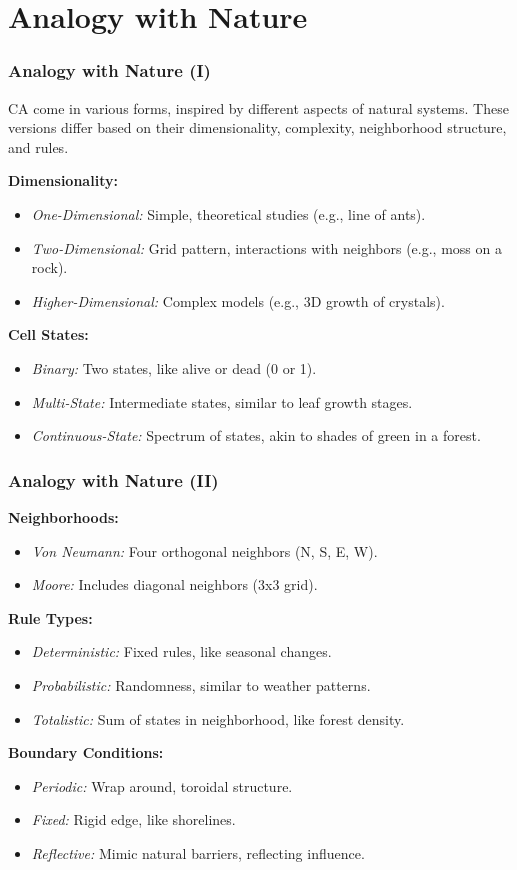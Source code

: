 \documentclass{beamer}
\begin{document}
\section{Analogy with Nature}
\begin{frame}
    \frametitle{Analogy with Nature (I)}
    CA come in various forms, inspired by different aspects of natural systems. These versions differ based on their dimensionality, complexity, neighborhood structure, and rules.
    
    \textbf{Dimensionality:}
    \begin{itemize}
        \item \textit{One-Dimensional:} Simple, theoretical studies (e.g., line of ants).
        \item \textit{Two-Dimensional:} Grid pattern, interactions with neighbors (e.g., moss on a rock).
        \item \textit{Higher-Dimensional:} Complex models (e.g., 3D growth of crystals).
    \end{itemize}
    
    \textbf{Cell States:}
    \begin{itemize}
        \item \textit{Binary:} Two states, like alive or dead (0 or 1).
        \item \textit{Multi-State:} Intermediate states, similar to leaf growth stages.
        \item \textit{Continuous-State:} Spectrum of states, akin to shades of green in a forest.
    \end{itemize}
\end{frame}

\begin{frame}
    \frametitle{Analogy with Nature (II)}
    \textbf{Neighborhoods:}
    \begin{itemize}
        \item \textit{Von Neumann:} Four orthogonal neighbors (N, S, E, W).
        \item \textit{Moore:} Includes diagonal neighbors (3x3 grid).
    \end{itemize}
    
    \textbf{Rule Types:}
    \begin{itemize}
        \item \textit{Deterministic:} Fixed rules, like seasonal changes.
        \item \textit{Probabilistic:} Randomness, similar to weather patterns.
        \item \textit{Totalistic:} Sum of states in neighborhood, like forest density.
    \end{itemize}
    
    \textbf{Boundary Conditions:}
    \begin{itemize}
        \item \textit{Periodic:} Wrap around, toroidal structure.
        \item \textit{Fixed:} Rigid edge, like shorelines.
        \item \textit{Reflective:} Mimic natural barriers, reflecting influence.
    \end{itemize}
\end{frame}
\end{document}
